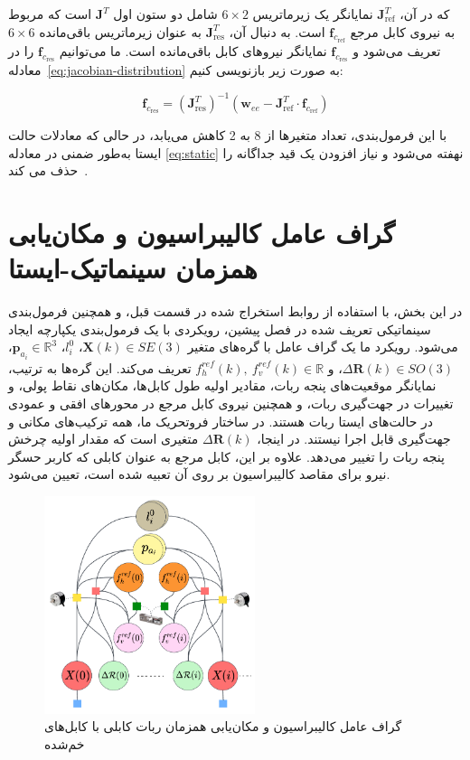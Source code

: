که در آن، $\bm{J}^T_{\text{ref}}$ نمایانگر یک زیرماتریس $6\times2$ شامل دو ستون اول $\bm{J}^T$ است که مربوط به نیروی کابل مرجع $\mathbf{f}_{c_{\text{ref}}}$ است. به دنبال آن، $\bm{J}^T_{\text{res}}$ به عنوان زیرماتریس باقی‌مانده $6\times6$ تعریف می‌شود و $\mathbf{f}_{c_{\text{res}}}$ نمایانگر نیروهای کابل باقی‌مانده است. ما می‌توانیم $\mathbf{f}_{c_{\text{res}}}$ را در معادله~\eqref{eq:jacobian-distribution} به صورت زیر بازنویسی کنیم:

\begin{equation} \label{eq:force_base_cable_one}
	\mathbf{f}_{c_{\text{res}}} = (\bm{J}_{\text{res}}^T)^{-1} \left( \mathbf{w}_{ee} - \bm{J}_{\text{ref}}^T \cdot \mathbf{f}_{c_{\text{ref}}} \right)
\end{equation}

با این فرمول‌بندی، تعداد متغیرها از 8 به 2 کاهش می‌یابد، در حالی که معادلات حالت ایستا به‌طور ضمنی در معادله \eqref{eq:static} نهفته می‌شود و نیاز افزودن یک قید جداگانه را حذف می کند~\cite{borgstrom2009nims}.




\section{گراف عامل کالیبراسیون و مکان‌یابی همزمان سینماتیک-ایستا} \label{sec:calib_factor}

در این بخش، با استفاده از روابط استخراج شده در قسمت قبل، و همچنین فرمول‌بندی سینماتیکی تعریف شده در فصل پیشین، رویکردی با یک فرمول‌بندی یکپارچه ایجاد می‌شود. رویکرد ما یک گراف عامل با گره‌های متغیر
$\bm{X}(k) \in SE(3)$، $l^0_i$، $\bm{p}_{a_i} \in \mathbb{R}^3$، $\Delta\mathcal{\bm{R}}(k) \in SO(3)$، و $f^{ref}_{h}(k), \ f^{ref}_{v}(k) \in \mathbb{R}$
تعریف می‌کند. این گره‌ها به ترتیب، نمایانگر موقعیت‌های پنجه ربات، مقادیر اولیه طول کابل‌ها، مکان‌های نقاط پولی، و تغییرات در جهت‌گیری ربات، و همچنین نیروی کابل مرجع در محورهای افقی و عمودی در حالت‌های ایستا ربات هستند. در ساختار فروتحریک ما، همه ترکیب‌های مکانی و جهت‌گیری قابل اجرا نیستند. در اینجا، $\Delta\mathcal{\bm{R}}(k)$ متغیری است که مقدار اولیه چرخش پنجه ربات را تغییر می‌دهد. علاوه بر این، کابل مرجع به عنوان کابلی که کاربر حسگر نیرو برای مقاصد کالیبراسیون بر روی آن تعبیه شده است، تعیین می‌شود.

\begin{figure} [t]
	\centering
	\includegraphics[width=0.55\textwidth]{img/CALIBRATION_GRAPH.pdf}
	\caption{گراف عامل کالیبراسیون و مکان‌یابی همزمان ربات کابلی با کابل‌های خم‌شده}
	\label{fig:calibration_FG}
\end{figure}

